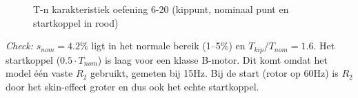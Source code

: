 \begin{oefenblok}
    \begin{figure}[H]
      \centering
      \caption{T-n karakteristiek oefening 6-20 (kippunt, nominaal punt en startkoppel in rood)}
      \label{fig:tn-oefening-6-20}
    \end{figure}

    \textit{Check:} $s_{nom} = 4.2\%$ ligt in het normale bereik (1--5\%) en
    $T_{kip}/T_{nom} = 1.6$.
    Het startkoppel ($0.5 \cdot T_{nom}$) is laag voor een klasse B-motor.
    Dit komt omdat het model één vaste $R_2$ gebruikt, gemeten bij 15Hz.
    Bij de start (rotor op 60Hz) is $R_2$ door het skin-effect groter en dus ook het
    echte startkoppel.
\end{oefenblok}


